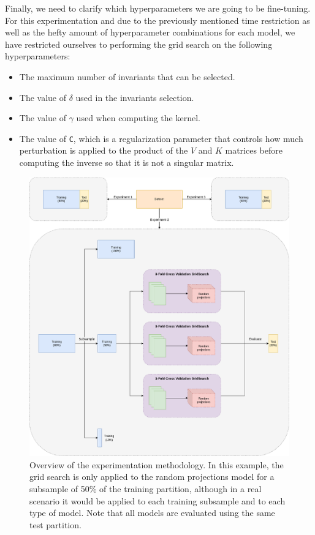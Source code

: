Finally, we need to clarify which hyperparameters we are going to be fine-tuning. For this experimentation and due
to the previously mentioned time restriction as well as the hefty amount of hyperparameter combinations for each
model, we have restricted ourselves to performing the grid search on the following hyperparameters:

\begin{itemize}
    \item The maximum number of invariants that can be selected.
    \item The value of $\delta$ used in the invariants selection.
    \item The value of $\gamma$ used when computing the kernel.
    \item The value of \texttt{C}, which is a regularization parameter that controls how much perturbation
    is applied to the product of the $V$ and $K$ matrices before computing the inverse so that it is not a
    singular matrix.
\end{itemize}

\begin{figure}[h]
    \centering
    \includegraphics[width=\textwidth]{thesis/Figures/experimentation_scheme.drawio.png}
    \caption{Overview of the experimentation methodology. In this example, the grid search is only applied to
    the random projections model for a subsample of 50\% of the training partition, although in a real scenario
    it would be applied to each training subsample and to each type of model. Note that all models are evaluated using
    the same test partition.}
    \label{fig:experimentation_setup}
\end{figure}

